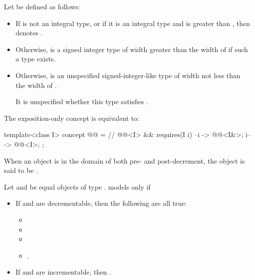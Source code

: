 \pnum
Let  be defined as follows:
\begin{itemize}
\item
  If  is not an integral type, or
  if it is an integral type and 
  is greater than ,
  then  denotes .
\item
  Otherwise, 
  is a signed integer type of width greater than the width of 
  if such a type exists.
\item
  Otherwise, 
  is an unspecified signed-integer-like type
  of width not less than the width of .
  \begin{note}
  It is unspecified
  whether this type satisfies .
  \end{note}
\end{itemize}

\pnum
The exposition-only  concept is equivalent to:
\begin{itemdecl}
template<class I>
  concept @@ =               // \expos
    @@<I> && requires(I i) {
      { --i } -> @@<I&>;
      { i-- } -> @@<I>;
    };
\end{itemdecl}

\begin{itemdescr}
\pnum
When an object is in the domain of both pre- and post-decrement,
the object is said to be .

\pnum
Let  and  be equal objects of type .
 models  only if
\begin{itemize}
\item If  and  are decrementable,
  then the following are all true:
  \begin{itemize}
  \item {}
  \item {}
  \item {}
  \item {}.
  \end{itemize}
\item If  and  are incrementable,
  then .
\end{itemize}
\end{itemdescr}

